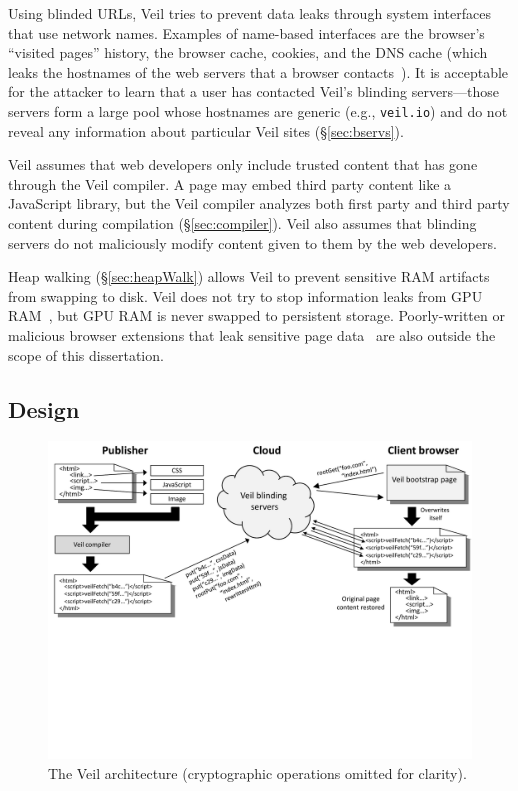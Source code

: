 Using blinded URLs, Veil tries to prevent data leaks
through system interfaces that use network names.
Examples of name-based interfaces are the browser's ``visited pages''
history, the browser cache, cookies, and the DNS
cache (which leaks the hostnames of the web servers
that a browser contacts~\cite{aggarwal10}). It is
acceptable for the attacker to learn that a user
has contacted Veil's blinding servers---those
servers form a large pool whose hostnames are generic
(e.g., \texttt{veil.io}) and do not reveal
any information about particular Veil sites
(\S\ref{sec:bservs}).

Veil assumes that web developers only include
trusted content that has gone through the Veil
compiler. A page may embed third party content like a JavaScript
library, but the Veil compiler analyzes both
first party and third party content during compilation
(\S\ref{sec:compiler}). Veil also assumes
that blinding servers do not maliciously 
modify content given to them by the web developers.

Heap walking (\S\ref{sec:heapWalk}) allows Veil
to prevent sensitive RAM artifacts from swapping to
disk. Veil does not try to stop information
leaks from GPU RAM~\cite{lee2014}, but GPU RAM
is never swapped to persistent storage. 
Poorly-written or malicious browser extensions that leak
sensitive page data~\cite{lerner13} are also outside the
scope of this dissertation.

\subsection{Design}
\label{sec:design}

\begin{figure}
	\centering
	\includegraphics[width=\textwidth]{veil-figs/arch_small_cropped}
	\caption{The Veil architecture (cryptographic operations omitted for clarity).}
	\label{fig:arch}
\end{figure}

